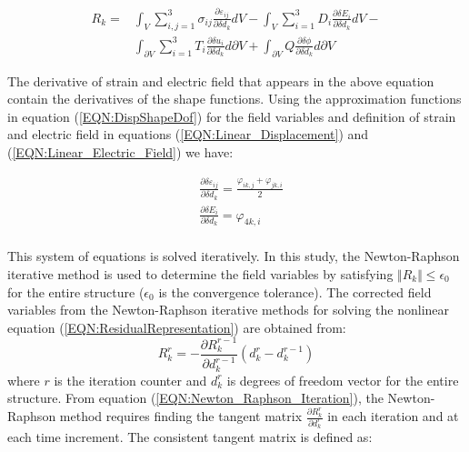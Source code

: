 \begin{equation}
\begin{aligned}
R_k=
& \int_V 
\sum_{i,j=1}^3 \sigma_{ij} \frac{\partial \varepsilon_{ij}}{\partial \delta d_k}dV-
\int_V 
\sum_{i=1}^3 D_{i} \frac{\partial \delta E_{i}}{\partial \delta d_k}  dV- \\
& \int_{\partial V} \sum_{i=1}^3 T_{i} \frac{\partial \delta u_{i}}{\partial \delta d_k}  d{\partial V}+
\int_{\partial V} 
Q \frac{\partial \delta \phi}{\partial \delta d_k}  d{\partial V} 
\end{aligned}
\label{EQN:Residual_Variation_of}
\end{equation}

The derivative of strain and electric field that appears in the above equation contain the derivatives of the shape functions. 
Using the approximation functions in equation (\ref{EQN:DispShapeDof}) for the field variables and definition of strain and electric field in equations (\ref{EQN:Linear_Displacement}) and (\ref{EQN:Linear_Electric_Field}) we have:

\begin{equation}
\begin{aligned}
&\frac{\partial \delta \varepsilon_{ij}}{\partial \delta d_k}=\frac{\varphi_{ik,j}+\varphi_{jk,i}}{2} \\
&\frac{\partial \delta E_{i}}{\partial \delta d_k}= \varphi_{4k,i}\\
\end{aligned}
\label{EQN:Shape_Fucntion_Derivitive}
\end{equation}

This system of equations is solved iteratively.  
In this study, the Newton-Raphson iterative method is used to determine the field variables by satisfying $\Vert R_k \Vert \leq \epsilon_0$ for the entire structure ($\epsilon_0$ is the convergence tolerance).
The corrected field variables from the Newton-Raphson iterative methods for solving the nonlinear equation (\ref{EQN:ResidualRepresentation}) are obtained from:
\begin{equation}
R_k^{r}=- \frac{\partial R_k^{r-1}}{\partial d_k^{r-1}} (d_k^{r}-d_k^{r-1})
\label{EQN:Newton_Raphson_Iteration}
\end{equation}
where $r$ is the iteration counter and $d_k^{r}$ is degrees of freedom vector for the entire structure. 
From equation (\ref{EQN:Newton_Raphson_Iteration}), the Newton-Raphson method requires finding the tangent matrix $\frac{\partial R_k^{r}}{\partial d_k^{r}}$ in each iteration and at each time increment. 
The consistent tangent matrix is defined as:

